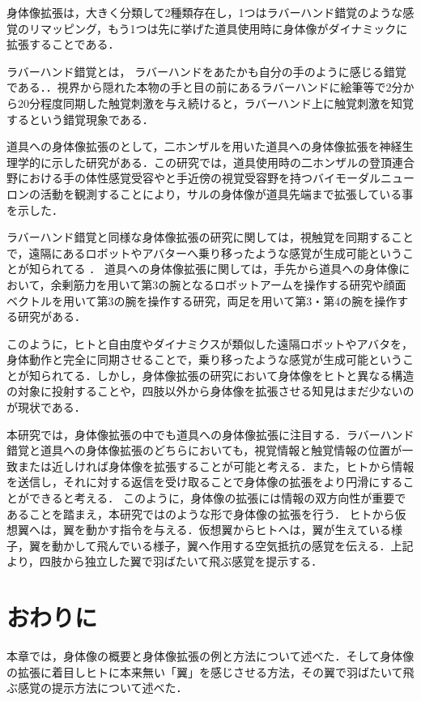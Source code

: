     身体像拡張は，大きく分類して2種類存在し，1つはラバーハンド錯覚\cite{botvinick1998rubber}のような感覚のリマッピング，もう1つは先に挙げた道具使用時に身体像がダイナミックに拡張することである．

    ラバーハンド錯覚とは， ラバーハンドをあたかも自分の手のように感じる錯覚である．．視界から隠れた本物の手と目の前にあるラバーハンドに絵筆等で2分から20分程度同期した触覚刺激を与え続けると，ラバーハンド上に触覚刺激を知覚するという錯覚現象である．

    道具への身体像拡張のとして，二ホンザルを用いた道具への身体像拡張を神経生理学的に示した研究がある\cite{iriki1996coding}．この研究では，道具使用時の二ホンザルの登頂連合野における手の体性感覚受容やと手近傍の視覚受容野を持つバイモーダルニューロンの活動を観測することにより，サルの身体像が道具先端まで拡張している事を示した．

    ラバーハンド錯覚と同様な身体像拡張の研究に関しては，視触覚を同期することで，遠隔にあるロボットやアバターへ乗り移ったような感覚が生成可能ということが知られてる
    \cite{tachi2015telexistence}\cite{iwasaki2017research}．
    道具への身体像拡張に関しては，手先から道具への身体像において，余剰筋力を用いて第3の腕となるロボットアームを操作する研究\cite{iwadare2017thirdarm}\cite{岩垂真哉2016余剰筋力を用いた第三の腕ロボットの操縦}や顔面ベクトルを用いて第3の腕を操作する研究\cite{iwasaki2017research}，両足を用いて第3・第4の腕を操作する研究がある\cite{sasaki2017metalimbs}．
    
    このように，ヒトと自由度やダイナミクスが類似した遠隔ロボットやアバタを，身体動作と完全に同期させることで，乗り移ったような感覚が生成可能ということが知られてる．しかし，身体像拡張の研究において身体像をヒトと異なる構造の対象に投射することや，四肢以外から身体像を拡張させる知見はまだ少ないのが現状である．


    本研究では，身体像拡張の中でも道具への身体像拡張に注目する．ラバーハンド錯覚と道具への身体像拡張のどちらにおいても，視覚情報と触覚情報の位置が一致または近しければ身体像を拡張することが可能と考える．また，ヒトから情報を送信し，それに対する返信を受け取ることで身体像の拡張をより円滑にすることができると考える．
    このように，身体像の拡張には情報の双方向性が重要であることを踏まえ，本研究ではのような形で身体像の拡張を行う．
    ヒトから仮想翼へは，翼を動かす指令を与える．仮想翼からヒトへは，翼が生えている様子，翼を動かして飛んでいる様子，翼へ作用する空気抵抗の感覚を伝える．上記より，四肢から独立した翼で羽ばたいて飛ぶ感覚を提示する．\\


\section{おわりに}
    本章では，身体像の概要と身体像拡張の例と方法について述べた．そして身体像の拡張に着目しヒトに本来無い「翼」を感じさせる方法，その翼で羽ばたいて飛ぶ感覚の提示方法について述べた．
    
